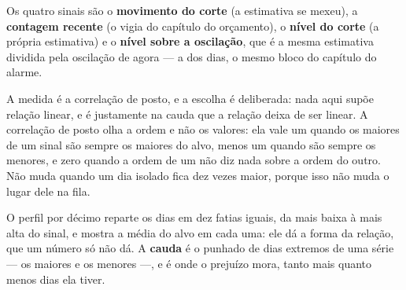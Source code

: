 Os quatro sinais são o \textbf{movimento do corte} (a estimativa se mexeu), a \textbf{contagem
recente} (o vigia do capítulo do orçamento), o \textbf{nível do corte} (a própria estimativa) e o
\textbf{nível sobre a oscilação}, que é a mesma estimativa dividida pela oscilação de agora --- a
dos \numEstabilidadeOscilacaoBloco{} dias, o mesmo bloco do capítulo do alarme.

A medida é a correlação de posto, e a escolha é deliberada: nada aqui supõe relação linear, e é
justamente na cauda que a relação deixa de ser linear. A correlação de posto olha a ordem e não os
valores: ela vale um quando os maiores de um sinal são sempre os maiores do alvo, menos um quando são
sempre os menores, e zero quando a ordem de um não diz nada sobre a ordem do outro. Não muda quando um
dia isolado fica dez vezes maior, porque isso não muda o lugar dele na fila.

\begin{table}[htbp]
  \centering
  \caption{Cada sinal olhando para trás, contra os rompimentos dos \numBlocoDias{} dias seguintes.
    A última coluna é a média do alvo no décimo mais baixo e no mais alto do sinal.}
  \label{tab:sinais}
\end{table}

O perfil por décimo reparte os dias em dez fatias iguais, da mais baixa à mais alta do sinal, e
mostra a média do alvo em cada uma: ele dá a forma da relação, que um número só não dá.
A \textbf{cauda} é o punhado de dias extremos de uma série --- os maiores e os menores ---, e é
onde o prejuízo mora, tanto mais quanto menos dias ela tiver.

